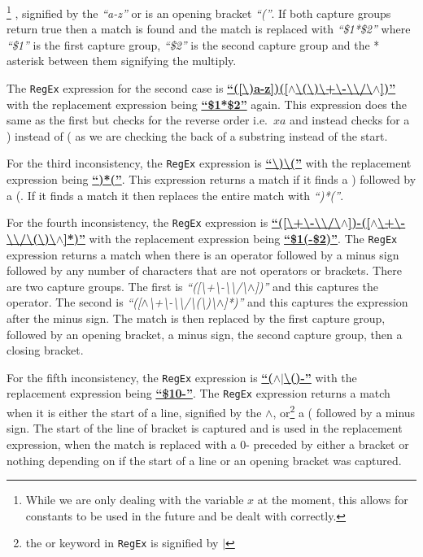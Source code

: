 \documentclass[../../../../../main.tex]{subfiles}
\begin{document}
 \footnote{While we are only dealing with the variable $x$ at the moment, this allows for constants to be used in the future and be dealt with correctly.}
 , signified by the \textit{``a-z''} or is an opening bracket \textit{``(''}. If both capture groups return true then a match is found and the match is replaced with \textit{``\$1*\$2''} where \textit{``\$1''} is the first capture group, \textit{``\$2''} is the second capture group and the * asterisk between them signifying the multiply.
 
The \texttt{RegEx} expression for the second case is
\textbf{\underline{``([\textbackslash)a-z])([$\wedge$\textbackslash(\textbackslash)\textbackslash+\textbackslash-\textbackslash*\textbackslash/\textbackslash$\wedge$])''}}
with the replacement expression being \textbf{\underline{``\$1*\$2''}} again. This expression does the same as the first but checks for the reverse order i.e.\ $xa$ and instead checks for a ) instead of ( as we are checking the back of a substring instead of the start.

For the third inconsistency, the \texttt{RegEx} expression is
\textbf{\underline{``\textbackslash)\textbackslash(''}}
with the replacement expression being \textbf{\underline{``)*(''}}. This expression returns a match if it finds a ) followed by a (. If it finds a match it then replaces the entire match with \textit{``)*(''}.

For the fourth inconsistency, the \texttt{RegEx} expression is
\textbf{\underline{``([\textbackslash+\textbackslash-\textbackslash*\textbackslash/\textbackslash$\wedge$])-([$\wedge$\textbackslash+\textbackslash-\textbackslash*\textbackslash/\textbackslash(\textbackslash)\textbackslash$\wedge$]*)''}}
with the replacement expression being \textbf{\underline{``\$1(-\$2)''}}. The \texttt{RegEx} expression returns a match when there is an operator followed by a minus sign followed by any number of characters that are not operators or brackets. There are two capture groups. The first is \textit{``([\textbackslash+\textbackslash-\textbackslash*\textbackslash/\textbackslash$\wedge$])''} and this captures the operator. The second is \textit{``([$\wedge$\textbackslash+\textbackslash-\textbackslash*\textbackslash/\textbackslash(\textbackslash)\textbackslash$\wedge$]*)''} and this captures the expression after the minus sign. The match is then replaced by the first capture group, followed by an opening bracket, a minus sign, the second capture group, then a closing bracket.

For the fifth inconsistency, the \texttt{RegEx} expression is
\textbf{\underline{``($\wedge$$|$\textbackslash()-''}}
with the replacement expression being \textbf{\underline{``\$10-''}}. The \texttt{RegEx} expression returns a match when it is either the start of a line, signified by the $\wedge$, or\footnote{the or keyword in \texttt{RegEx} is signified by $|$} a ( followed by a minus sign. The start of the line of bracket is captured and is used in the replacement expression, when the match is replaced with a 0- preceded by either a bracket or nothing depending on if the start of a line or an opening bracket was captured.
\newpage
\end{document}
